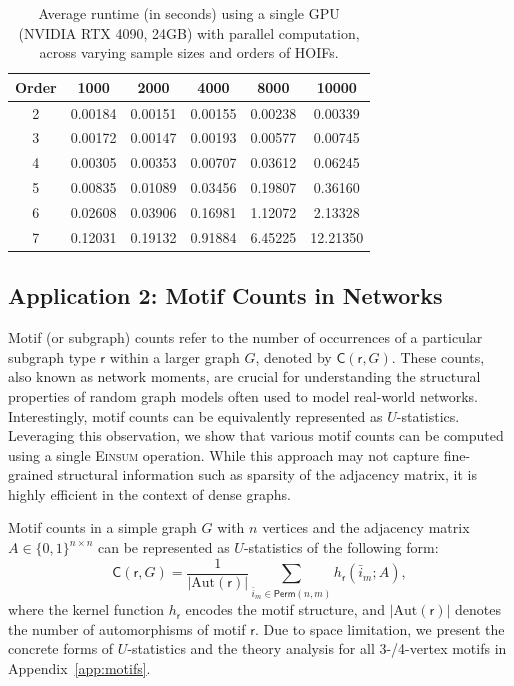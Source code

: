 \documentclass[sn-mathphys, natbib=false]{sn-jnl}
\theoremstyle{plain}
\theoremstyle{definition}
\def\Einsum{\textsc{Einsum}}
\def\sfr{\mathsf{r}}
\newcommand{\perm}[1]{\mathsf{Perm}(#1)}
\newcommand{\motifrg}[2]{\mathsf{C}(#1,#2)}
\begin{document}
\begin{bibunit}[agsm]
\begin{table}[ht]
\centering
\caption{Average runtime (in seconds) using a single GPU (NVIDIA RTX 4090, 24GB) with parallel computation, across varying sample sizes and orders of HOIFs.}
\label{tab:HOIF_GPU}
\begin{tabular}{cccccc}
\toprule
\textbf{Order} & \textbf{1000} & \textbf{2000} & \textbf{4000} & \textbf{8000} & \textbf{10000} \\
\midrule
2 & 0.00184 & 0.00151 & 0.00155 & 0.00238 & 0.00339 \\
3 & 0.00172 & 0.00147 & 0.00193 & 0.00577 & 0.00745 \\
4 & 0.00305 & 0.00353 & 0.00707 & 0.03612 & 0.06245 \\
5 & 0.00835 & 0.01089 & 0.03456 & 0.19807 & 0.36160 \\
6 & 0.02608 & 0.03906 & 0.16981 & 1.12072 & 2.13328 \\
7 & 0.12031 & 0.19132 & 0.91884 & 6.45225 & 12.21350 \\
\bottomrule
\end{tabular}
\end{table}
\fi

\subsection{Application 2: Motif Counts in Networks}
\label{sec:example_motif}

Motif (or subgraph) counts refer to the number of occurrences of a particular subgraph type $\sfr$ within a larger graph $G$, denoted by $\motifrg{\sfr}{G}$. These counts, also known as network moments, are crucial for understanding the structural properties of random graph models often used to model real-world networks. %
Interestingly, motif counts can be equivalently represented as $U$-statistics. Leveraging this observation, we show that various motif counts can be computed using a single \Einsum{} operation. While this approach may not capture fine-grained structural information such as sparsity of the adjacency matrix, it is highly efficient in the context of dense graphs.


Motif counts in a simple graph $G$ with $n$ vertices and the adjacency matrix $A \in \{0,1\}^{n \times n}$ can be represented as $U$-statistics of the following form:
\begin{equation*}
\motifrg{\sfr}{G} = \frac{1}{|\mathrm{Aut}(\sfr)|} \sum_{ \bar{i}_{m} \in \perm{n,m}} h_{\sfr} (\bar{i}_{m}; A),
\end{equation*}
where the kernel function $h_{\sfr}$ encodes the motif structure, and $|\mathrm{Aut} (\sfr)|$ denotes the number of automorphisms of motif $\sfr$. %
Due to space limitation, we present the concrete forms of $U$-statistics and the theory analysis for all 3-/4-vertex motifs in Appendix~\ref{app:motifs}.



\end{bibunit}
\end{document}
